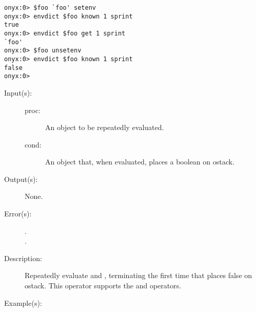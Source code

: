 \begin{description}
\begin{description}
\begin{verbatim}
onyx:0> $foo `foo' setenv
onyx:0> envdict $foo known 1 sprint
true
onyx:0> envdict $foo get 1 sprint
`foo'
onyx:0> $foo unsetenv
onyx:0> envdict $foo known 1 sprint
false
onyx:0>
		\end{verbatim}
	\end{description}
\label{systemdict:until}
\item[{\onyxop{proc cond}{until}{--}}: ]
	\begin{description}\item[]
	\item[Input(s): ]
		\begin{description}\item[]
		\item[proc: ]
			An object to be repeatedly evaluated.
		\item[cond: ]
			An object that, when evaluated, places a boolean on
			ostack.
		\end{description}
	\item[Output(s): ] None.
	\item[Error(s): ]
		\begin{description}\item[]
		\item[.]
		\item[.]
		\end{description}
	\item[Description: ]
		Repeatedly evaluate  and , terminating
		the first time that  places false on ostack.  This
		operator supports the
		 and
		 operators.
	\item[Example(s): ]\begin{verbatim}


\end{verbatim}
\end{description}
\end{description}
